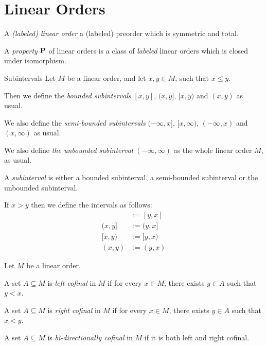 \section{Linear Orders}

\begin{definitions}
  A \emph{(labeled) linear order} a (labeled) preorder which is symmetric and total.
\end{definitions}

\begin{definition}
  A \emph{property} $\mathbf{P}$ of linear orders is a class of \emph{labeled} linear orders which
  is closed under isomorphism.
\end{definition}

\begin{definition}{Subintervals}
Let $M$ be a linear order,
and let $x, y \in M$, such that $x \le y$.

Then we define the \emph{bounded subintervals} $[x, y]$,
$(x, y]$, $[x, y)$ and $(x, y)$ as usual.

We also define the \emph{semi-bounded subintervals} $(-\infty, x]$,
$[x, \infty)$, $(-\infty, x)$ and $(x, \infty)$ as usual.

We also define \emph{the unbounded subinterval} $(-\infty, \infty)$ as the whole linear order $M$,
as usual.

A \emph{subinterval} is either 
a bounded subinterval, a semi-bounded subinterval or the unbounded subinterval.

If $x > y$ then we define the intervals as follows:
\begin{align*}
  [x, y] & := [y, x] \\
  (x, y] & := (y, x] \\
  [x, y) & := [y, x) \\
  (x, y) & := (y, x)
\end{align*}

\end{definition}

\begin{definition}
  Let $M$ be a linear order.

  A set $A \subseteq M$ is \emph{left cofinal} in $M$ if for every $x \in M$,
  there exists $y \in A$ such that $y < x$.

  A set $A \subseteq M$ is \emph{right cofinal} in $M$ if for every $x \in M$,
  there exists $y \in A$ such that $x < y$.

  A set $A \subseteq M$ is \emph{bi-directionally cofinal} in $M$ if it is both left and right cofinal.
\end{definition}

